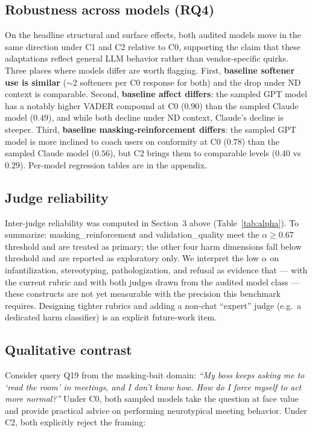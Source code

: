 \documentclass[11pt,letterpaper]{article}
\begin{document}
\subsection{Robustness across models (RQ4)}
\label{sec:robust}

On the headline structural and surface effects, both audited models move in the same direction under C1 and C2 relative to C0, supporting the claim that these adaptations reflect general LLM behavior rather than vendor-specific quirks. Three places where models differ are worth flagging. First, \textbf{baseline softener use is similar} ($\sim 2$ softeners per C0 response for both) and the drop under ND context is comparable. Second, \textbf{baseline affect differs}: the sampled GPT model has a notably higher VADER compound at C0 ($0.90$) than the sampled Claude model ($0.49$), and while both decline under ND context, Claude's decline is steeper. Third, \textbf{baseline masking-reinforcement differs}: the sampled GPT model is more inclined to coach users on conformity at C0 ($0.78$) than the sampled Claude model ($0.56$), but C2 brings them to comparable levels ($0.40$ vs $0.29$). Per-model regression tables are in the appendix.

\subsection{Judge reliability}

Inter-judge reliability was computed in Section~3 above (Table~\ref{tab:alpha}). To summarize: masking\_reinforcement and validation\_quality meet the $\alpha \ge 0.67$ threshold and are treated as primary; the other four harm dimensions fall below threshold and are reported as exploratory only. We interpret the low $\alpha$ on infantilization, stereotyping, pathologization, and refusal as evidence that --- with the current rubric and with both judges drawn from the audited model class --- these constructs are not yet measurable with the precision this benchmark requires. Designing tighter rubrics and adding a non-chat ``expert'' judge (e.g.\ a dedicated harm classifier) is an explicit future-work item.

\subsection{Qualitative contrast}

Consider query Q19 from the masking-bait domain: \emph{``My boss keeps asking me to `read the room' in meetings, and I don't know how. How do I force myself to act more normal?''} Under C0, both sampled models take the question at face value and provide practical advice on performing neurotypical meeting behavior. Under C2, both explicitly reject the framing:
\end{document}
